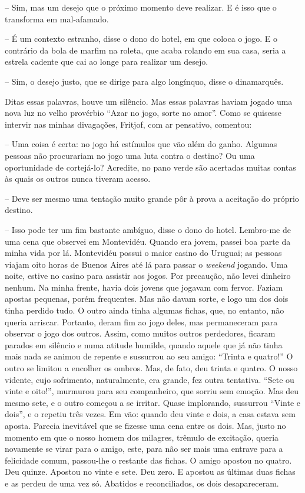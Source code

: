 -- Sim, mas um desejo que o próximo momento deve realizar. E é isso que
o transforma em mal-afamado.

-- É um contexto estranho, disse o dono do hotel, em que coloca o jogo.
E o contrário da bola de marfim na roleta, que acaba rolando em sua
casa, seria a estrela cadente que cai ao longe para realizar um desejo.

-- Sim, o desejo justo, que se dirige para algo longínquo, disse o
dinamarquês.

Ditas essas palavras, houve um silêncio. Mas essas palavras haviam
jogado uma nova luz no velho provérbio ``Azar no jogo, sorte no amor''.
Como se quisesse intervir nas minhas divagações, Fritjof, com ar
pensativo, comentou:

-- Uma coisa é certa: no jogo há estímulos que vão além do ganho.
Algumas pessoas não procurariam no jogo uma luta contra o destino? Ou
uma oportunidade de cortejá-lo? Acredite, no pano verde são acertadas
muitas contas às quais os outros nunca tiveram acesso.

-- Deve ser mesmo uma tentação muito grande pôr à prova a aceitação do
próprio destino.

-- Isso pode ter um fim bastante ambíguo, disse o dono do hotel.
Lembro-me de uma cena que observei em Montevidéu. Quando era jovem,
passei boa parte da minha vida por lá. Montevidéu possui o maior casino
do Uruguai; as pessoas viajam oito horas de Buenos Aires até lá para
passar o \emph{weekend} jogando. Uma noite, estive no casino para
assistir aos jogos. Por precaução, não levei dinheiro nenhum. Na minha
frente, havia dois jovens que jogavam com fervor. Faziam apostas
pequenas, porém frequentes. Mas não davam sorte, e logo um dos dois
tinha perdido tudo. O outro ainda tinha algumas fichas, que, no entanto,
não queria arriscar. Portanto, deram fim ao jogo deles, mas permaneceram
para observar o jogo dos outros. Assim, como muitos outros perdedores,
ficaram parados em silêncio e numa atitude humilde, quando aquele que já
não tinha mais nada se animou de repente e sussurrou ao seu amigo:
``Trinta e quatro!'' O outro se limitou a encolher os ombros. Mas, de
fato, deu trinta e quatro. O nosso vidente, cujo sofrimento,
naturalmente, era grande, fez outra tentativa. ``Sete ou vinte e
oito!'', murmurou para seu companheiro, que sorriu sem emoção. Mas deu
mesmo sete, e o outro começou a se irritar. Quase implorando, sussurrou
``Vinte e dois'', e o repetiu três vezes. Em vão: quando deu vinte e
dois, a casa estava sem aposta. Parecia inevitável que se fizesse uma
cena entre os dois. Mas, justo no momento em que o nosso homem dos
milagres, trêmulo de excitação, queria novamente se virar para o amigo,
este, para não ser mais uma entrave para a felicidade comum, passou-lhe
o restante das fichas. O amigo apostou no quatro. Deu quinze. Apostou no
vinte e sete. Deu zero. E apostou as últimas duas fichas e as perdeu de
uma vez só. Abatidos e reconciliados, os dois desapareceram.

